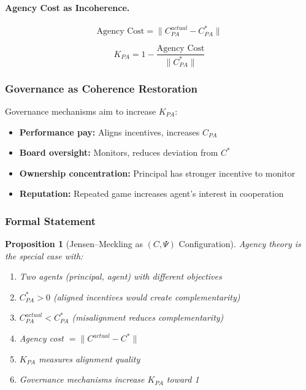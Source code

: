 \documentclass[12pt,a4paper]{article}
\newtheorem{proposition}[theorem]{Proposition}
\begin{document}
\paragraph{Agency Cost as Incoherence.}
\begin{equation}
  \text{Agency Cost} = \|C_{PA}^{actual} - C_{PA}^*\|
\end{equation}

\begin{equation}
  K_{PA} = 1 - \frac{\text{Agency Cost}}{\|C_{PA}^*\|}
\end{equation}

\subsubsection{Governance as Coherence Restoration}

Governance mechanisms aim to increase $K_{PA}$:
\begin{itemize}
  \item \textbf{Performance pay:} Aligns incentives, increases $C_{PA}$
  \item \textbf{Board oversight:} Monitors, reduces deviation from $C^*$
  \item \textbf{Ownership concentration:} Principal has stronger incentive to monitor
  \item \textbf{Reputation:} Repeated game increases agent's interest in cooperation
\end{itemize}

\subsubsection{Formal Statement}

\begin{proposition}[Jensen--Meckling as $(C, \Psi)$ Configuration]
Agency theory is the special case with:
\begin{enumerate}
  \item Two agents (principal, agent) with different objectives
  \item $C_{PA}^* > 0$ (aligned incentives would create complementarity)
  \item $C_{PA}^{actual} < C_{PA}^*$ (misalignment reduces complementarity)
  \item Agency cost $= \|C^{actual} - C^*\|$
  \item $K_{PA}$ measures alignment quality
  \item Governance mechanisms increase $K_{PA}$ toward 1
\end{enumerate}
\end{proposition}
\end{document}
